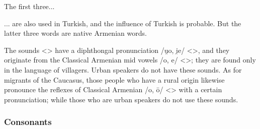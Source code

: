 \begin{table}[H]
	\centering
	\caption{Presence of the vowel /æ/ < > in the Karin dialect}
	\label{tab:Karin:phono:segment:vowel:ae}
\end{table}


The first three... 




\begin{adjarianpage}\label{page:105}\end{adjarianpage}%


... are also used in Turkish, and the influence of Turkish is probable. But the latter three words are native Armenian words.

\label{karin:phono:segment:vowel:diph}

The sounds <> have a diphthongal pronunciation /u̯o, i̯e/ <>, and they originate from the Classical Armenian mid vowels /o, e/ <>; they are found only in the language of villagers. Urban speakers do not have these sounds. As for migrants of the Caucasus, those people who have a rural origin likewise pronounce the reflexes of Classical Armenian /o, ō/ <> with a certain pronunciation; while those who are urban speakers do not use these sounds. 

\subsubsection{Consonants}

